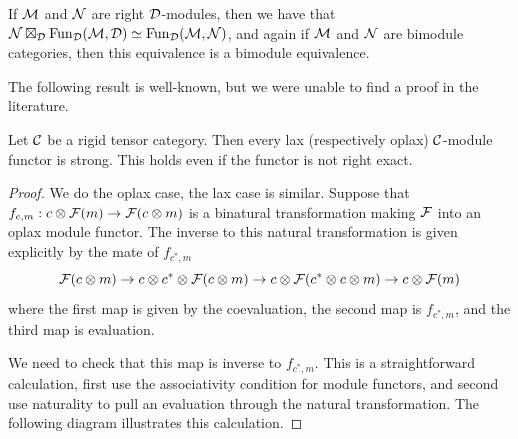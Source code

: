 \documentclass{amsart}
\begin{document}
\begin{remark} \label{remark-tensorasfunctors}
If $\mathcal M$ and $\mathcal N$ are right $\mathcal D$-modules, then we have that $\mathcal N \boxtimes_\mathcal D \operatorname{Fun}_{\mathcal D}(\mathcal M,\mathcal D) \simeq \operatorname{Fun}_{\mathcal D}(\mathcal M,\mathcal N)$, and again if $\mathcal M$ and $\mathcal N$ are bimodule categories, then this equivalence is a bimodule equivalence. 
\end{remark}


The following result is well-known, but we were unable to find a proof in the literature.

\begin{lemma} 
	Let $\mathcal C$ be a rigid tensor category. Then every lax (respectively oplax) $\mathcal C$-module functor is strong. This holds even if the functor is not right exact.   
\end{lemma}

\begin{proof}
We do the oplax case, the lax case is similar.  Suppose that $f_{c,m}:  c \otimes \mathcal F(m) \rightarrow \mathcal F(c \otimes m)$ is a binatural transformation making $\mathcal F$ into an oplax module functor.  The inverse to this natural transformation is given explicitly by the mate of $f_{c^*,m}$ 
$$\mathcal F(c \otimes m) \rightarrow c \otimes c^* \otimes \mathcal F(c \otimes m) \rightarrow c \otimes \mathcal F(c^* \otimes c \otimes m) \rightarrow c \otimes \mathcal F(m)$$
where the first map is given by the coevaluation, the second map is $f_{c^*,m}$, and the third map is evaluation.


We need to check that this map is inverse to $f_{c^*,m}$.  This is a straightforward calculation, first use the associativity condition for module functors, and second use naturality to pull an evaluation through the natural transformation.  The following diagram illustrates this calculation.

\end{proof}
\end{document}
